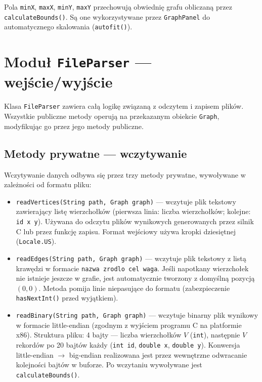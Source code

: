 \documentclass[a4paper, 11pt]{article}
\begin{document}
Pola \texttt{minX}, \texttt{maxX}, \texttt{minY}, \texttt{maxY}
przechowują obwiednię grafu obliczaną przez \texttt{calculateBounds()}.
Są one wykorzystywane przez \texttt{GraphPanel} do automatycznego
skalowania (\texttt{autofit()}).

\section{Moduł \texttt{FileParser} --- wejście/wyjście}

Klasa \texttt{FileParser} zawiera całą logikę związaną z odczytem
i zapisem plików. Wszystkie publiczne metody operują na przekazanym
obiekcie \texttt{Graph}, modyfikując go przez jego metody publiczne.

\subsection{Metody prywatne --- wczytywanie}

Wczytywanie danych odbywa się przez trzy metody prywatne, wywoływane
w zależności od formatu pliku:

\begin{itemize}
  \item \texttt{readVertices(String path, Graph graph)} --- wczytuje
    plik tekstowy zawierający listę wierzchołków (pierwsza linia: liczba
    wierzchołków; kolejne: \texttt{id x y}). Używana do odczytu plików
    wynikowych generowanych przez silnik C lub przez funkcję zapisu.
    Format wejściowy używa kropki dziesiętnej (\texttt{Locale.US}).

  \item \texttt{readEdges(String path, Graph graph)} --- wczytuje
    plik tekstowy z listą krawędzi w formacie \texttt{nazwa zrodlo cel waga}.
    Jeśli napotkany wierzchołek nie istnieje jeszcze w grafie, jest
    automatycznie tworzony z domyślną pozycją $(0, 0)$. Metoda pomija
    linie niepasujące do formatu (zabezpieczenie \texttt{hasNextInt()}
    przed wyjątkiem).

  \item \texttt{readBinary(String path, Graph graph)} --- wczytuje
    binarny plik wynikowy w formacie little-endian (zgodnym z wyjściem
    programu C na platformie x86). Struktura pliku: 4 bajty --- liczba
    wierzchołków $V$ (\texttt{int}), następnie $V$ rekordów po 20 bajtów
    każdy (\texttt{int id}, \texttt{double x}, \texttt{double y}).
    Konwersja little-endian $\rightarrow$ big-endian realizowana jest
    przez wewnętrzne odwracanie kolejności bajtów w buforze.
    Po wczytaniu wywoływane jest \texttt{calculateBounds()}.
\end{itemize}
\end{document}
